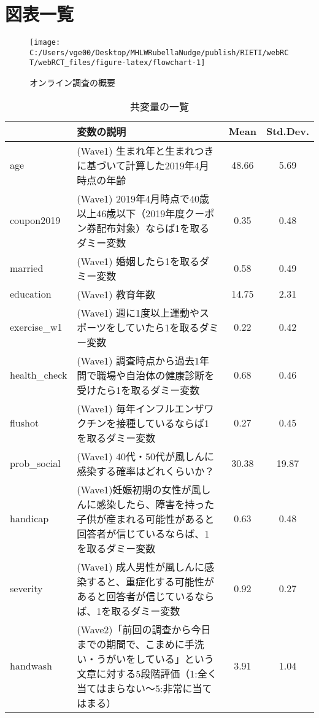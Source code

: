 \documentclass[
  11pt,
  a4paper,
]{article}
\begin{document}
\newpage

\hypertarget{appendix-appendix}{%
\appendix}


\hypertarget{addtab}{%
\section{図表一覧}\label{addtab}}

\begin{figure}[t]
\texttt{[image: C:/Users/vge00/Desktop/MHLWRubellaNudge/publish/RIETI/webRCT/webRCT\_files/figure-latex/flowchart-1]} \caption{オンライン調査の概要}\label{fig:flowchart}
\end{figure}

\begin{table}[!h]

\caption{\label{tab:covlist}共変量の一覧}
\centering
\fontsize{9}{11}\selectfont
\begin{tabular}[t]{l>{\raggedright\arraybackslash}p{30em}cc}
\toprule
  & 変数の説明 & Mean & Std.Dev.\\
\midrule
age & (Wave1) 生まれ年と生まれつきに基づいて計算した2019年4月時点の年齢 & 48.66 & 5.69\\
coupon2019 & (Wave1) 2019年4月時点で40歳以上46歳以下（2019年度クーポン券配布対象）ならば1を取るダミー変数 & 0.35 & 0.48\\
married & (Wave1) 婚姻したら1を取るダミー変数 & 0.58 & 0.49\\
education & (Wave1) 教育年数 & 14.75 & 2.31\\
exercise\_w1 & (Wave1) 週に1度以上運動やスポーツをしていたら1を取るダミー変数 & 0.22 & 0.42\\
health\_check & (Wave1) 調査時点から過去1年間で職場や自治体の健康診断を受けたら1を取るダミー変数 & 0.68 & 0.46\\
flushot & (Wave1) 毎年インフルエンザワクチンを接種しているならば1を取るダミー変数 & 0.27 & 0.45\\
prob\_social & (Wave1) 40代・50代が風しんに感染する確率はどれくらいか？ & 30.38 & 19.87\\
handicap & (Wave1)妊娠初期の女性が風しんに感染したら、障害を持った子供が産まれる可能性があると回答者が信じているならば、1を取るダミー変数 & 0.63 & 0.48\\
severity & (Wave1) 成人男性が風しんに感染すると、重症化する可能性があると回答者が信じているならば、1を取るダミー変数 & 0.92 & 0.27\\
handwash & (Wave2)「前回の調査から今日までの期間で、こまめに手洗い・うがいをしている」という文章に対する5段階評価（1:全く当てはまらない～5:非常に当てはまる） & 3.91 & 1.04\\

\end{tabular}
\end{table}
\end{document}
